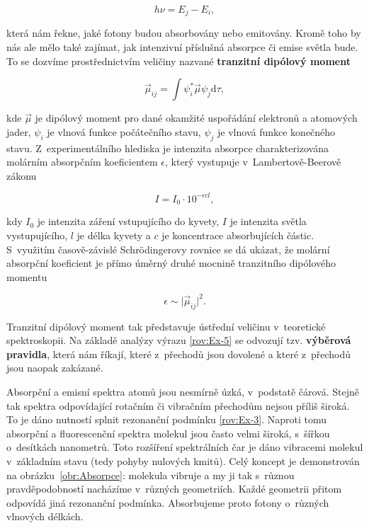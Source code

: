 \begin{equation}
h \nu = E_j - E_i,
\label{rov:Ex-2}
\end{equation}

\noindent která nám řekne, jaké fotony budou absorbovány nebo emitovány. Kromě toho by nás ale mělo také zajímat, jak intenzivní příslušná absorpce či emise světla bude. To se dozvíme prostřednictvím veličiny nazvané \textbf{tranzitní dipólový moment}


\begin{equation}
\vec{\mu}_{ij} = \int \psi_i^{\ast} \vec{\mu} \psi_j \mathrm{d} \tau,
\label{rov:Ex-3}
\end{equation}


\noindent kde $\vec{\mu}$ je dipólový moment pro dané okamžité uspořádání elektronů a atomových jader, $\psi_i$ je vlnová funkce počátečního stavu, $\psi_j$ je vlnová funkce konečného stavu. Z~experimentálního hlediska je intenzita absorpce charakterizována molárním absorpčním koeficientem $\epsilon$, který vystupuje v~Lambertově-Beerově zákonu

\begin{equation}
I = I_0 \cdot 10^{-\epsilon c l},
\label{rov:Ex-4}
\end{equation}

\noindent kdy $I_0$ je intenzita záření vstupujícího do kyvety, $I$ je intenzita světla vystupujícího, $l$ je délka kyvety a $c$ je koncentrace absorbujících částic. S~využitím časově-závislé Schr\"odingerovy rovnice se dá ukázat, že molární absorpční koeficient je přímo úměrný druhé mocnině tranzitního dipólového momentu

\begin{equation}
\epsilon \sim \vert \vec{\mu}_{ij} \vert^2.
\label{rov:Ex-5}
\end{equation}

Tranzitní dipólový moment tak představuje ústřední veličinu v~teoretické spektroskopii. Na základě analýzy výrazu \eqref{rov:Ex-5} se odvozují tzv. \textbf{výběrová pravidla}, která nám říkají, které z~přechodů jsou dovolené a které z~přechodů jsou naopak zakázané.

Absorpční a emisní spektra atomů jsou nesmírně úzká, v~podstatě čárová. Stejně tak spektra odpovídající rotačním či vibračním přechodům nejsou příliš široká. To je dáno nutností splnit rezonanční podmínku \eqref{rov:Ex-3}. Naproti tomu absorpční a fluorescenční spektra molekul jsou často velmi široká, s~šířkou o~desítkách nanometrů. Toto rozšíření spektrálních čar je dáno vibracemi molekul v~základním stavu (tedy pohyby nulových kmitů). Celý koncept je demonstrován na obrázku~\ref{obr:Absorpce}: molekula vibruje  a my ji tak s~různou pravděpodobností nacházíme v~různých geometriích. Každé geometrii přitom odpovídá jiná rezonanční podmínka. Absorbujeme proto fotony o~různých vlnových délkách.

